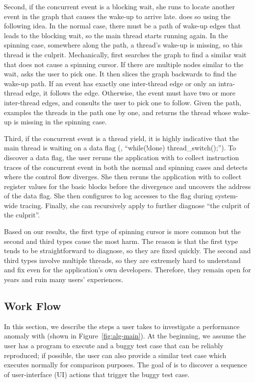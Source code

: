 Second, if the concurrent event is a blocking wait, she runs \xxx to locate
another event in the graph that causes the wake-up to arrive late. \xxx does so
using the following idea.  In the normal case, there must be a path of wake-up
edges that leads to the blocking wait, so the main thread starts running again.
In the spinning case, somewhere along the path, a thread's wake-up is missing,
so this thread is the culprit.  Mechanically, \xxx first searches the graph to
find a similar wait that does not cause a spinning cursor.  If there are
multiple nodes similar to the wait, \xxx asks the user to pick one.  It then
slices the graph backwards to find the wake-up path.  If an event has exactly
one inter-thread edge or only an intra-thread edge, it follows the edge.
Otherwise, the event must have two or more inter-thread edges, and \xxx
consults the user to pick one to follow.  Given the path, \xxx examples the
threads in the path one by one, and returns the thread whose wake-up is missing
in the spinning case.

Third, if the concurrent event is a thread yield, it is highly indicative that
the main thread is waiting on a data flag (\eg, ``while(!done)
thread\_switch();'').  To discover a data flag, the user reruns the application
with \xxx to collect instruction traces of the concurrent event in both the
normal and spinning cases and detects where the control flow diverges.  She
then reruns the application with \xxx to collect register values for the basic
blocks before the divergence and uncovers the address of the data flag.  She
then configures \xxx to log accesses to the flag during system-wide tracing.
Finally, she can recursively apply \xxx to further diagnose ``the culprit of
the culprit''. 

Based on our results, the first type of spinning cursor is more common but the
second and third types cause the most harm.  The reason is that the first type
tends to be straightforward to diagnose, so they are fixed quickly.  The second
and third types involve multiple threads, so they are extremely hard to
understand and fix even for the application's own developers.  Therefore, they
remain open for years and ruin many users' experiences.

\subsection{\xxx Work Flow}

In this section, we describe the steps a user takes to investigate a
performance anomaly with \xxx (shown in Figure~\ref{fig:alg-main}). At the
beginning, we assume the user has a program to execute and a buggy test case
that can be reliably reproduced; if possible, the user can also provide a
similar test case which executes normally for comparison purposes. The goal of
\xxx is to discover a sequence of user-interface (UI) actions that trigger the
buggy test case.

